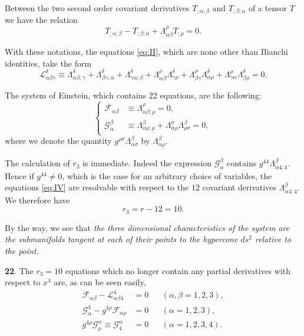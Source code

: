 \documentclass[leqno,11pt]{article}
\theoremstyle{shape1}
\theoremstyle{shape0}
\theoremstyle{shape2}
\theoremstyle{definition}
\begin{document}
Between the two second order covariant derivatives $T_{;\alpha;\beta}$ and $T_{;\beta;\alpha}$ of a tensor $T$ we have the relation
\[
T_{;\alpha;\beta}-T_{;\beta;\alpha}+\Lambda^{\rho}_{\alpha\beta}T_{;\rho}=0.
\]

With these notations, the equations \eqref{eq:II}, which are none other than Bianchi identities, take the form
\begin{equation}
  \label{eq:II'}\tag{II$'$}
  \mathcal{L}^{\delta}_{\alpha\beta\gamma}\equiv \Lambda^{\delta}_{\alpha\beta;\gamma}+\Lambda^{\delta}_{\beta\gamma;\alpha}+\Lambda^{\delta}_{\gamma\alpha;\beta}+\Lambda^{\rho}_{\alpha\beta}\Lambda^{\delta}_{\gamma\rho}+\Lambda^{\rho}_{\beta\gamma}\Lambda^{\delta}_{\alpha\rho}+\Lambda^{\rho}_{\gamma\alpha}\Lambda^{\delta}_{\beta\rho}=0.
\end{equation}

The system of Einstein, which contains $22$ equations, are the following:
\begin{equation}
  \label{eq:IV}\tag{IV}
  \left\{
    \begin{aligned}
      \mathcal{F}_{\alpha\beta}&\equiv\Lambda^{\rho}_{\alpha\beta;\rho}=0,\\
      \mathcal{G}^{\beta}_{\alpha}&\equiv\Lambda^{\beta}_{\alpha\rho;\underline\rho}+\Lambda^{\sigma}_{\alpha\rho}\Lambda^{\beta}_{\rho\sigma}=0,
    \end{aligned}
  \right.
\end{equation}
where we denote the quantity $g^{\rho\sigma}\Lambda^{\beta}_{\alpha\sigma}$ by $\Lambda^{\beta}_{\alpha\underline\rho}$.

The calculation of $r_{3}$ is immediate. Indeed the expression $\mathcal{G}^{\beta}_{\alpha}$ contains $g^{44}\Lambda^{\beta}_{\alpha4;4}$. Hence if $g^{44}\neq 0$,  which is the case for an arbitrary choice of variables, the equations \eqref{eq:IV} are resolvable with respect to the $12$ covariant derivatives $\Lambda^{\beta}_{\alpha 4;4}$. We therefore have
\[
r_{3}=r-12=10.
\]

By the way, we see that \emph{the three dimensional characteristics of the system are the submanifolds tangent at each of their points to the hypercone $ds^{2}$ relative to the point.}

\vspace{12pt}

\textbf{22}. The $r_{3}=10$ equations which no longer contain any partial derivatives with respect to $x^{4}$ are, as can be seen easily,
\begin{align*}
  \mathcal{F}_{\alpha\beta}-\mathcal{L}^{4}_{\alpha\beta4}&=0&&(\alpha,\beta=1,2,3),\\
  \mathcal{G}^{4}_{\alpha}-g^{4\rho}\mathcal{F}_{\alpha\rho}&=0&&(\alpha=1,2,3),\\
  g^{4\rho}\mathcal{G}^{\alpha}_{\rho}\equiv \mathcal{G}^{\alpha}_{4}&=0&&(\alpha=1,2,3,4).
\end{align*}
\end{document}
